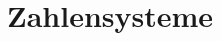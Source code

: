 \section{Zahlensysteme}\label{sec:zahlensysteme}

\begin{comment}
    \subsection{Vergleich}\label{subsec:vergleich}
    \begin{center}
        \begin{tabular}{|c|c|c|}
            \hline
            10-er System & 2-er System & 16-er System \\
            \hline
            \hline
            0            & 0000        & 0            \\
            \hline
            1            & 0001        & 1            \\
            \hline
            2            & 0010        & 2            \\
            \hline
            3            & 0011        & 3            \\
            \hline
            4            & 0100        & 4            \\
            \hline
            5            & 0101        & 5            \\
            \hline
            6            & 0110        & 6            \\
            \hline
            7            & 0111        & 7            \\
            \hline
            8            & 1000        & 8            \\
            \hline
            9            & 1001        & 9            \\
            \hline
            10           & 1010        & A            \\
            \hline
            11           & 1011        & B            \\
            \hline
            12           & 1100        & C            \\
            \hline
            13           & 1101        & D            \\
            \hline
            14           & 1110        & E            \\
            \hline
            15           & 1111        & F            \\
            \hline
        \end{tabular}
    \end{center}
\end{comment}

